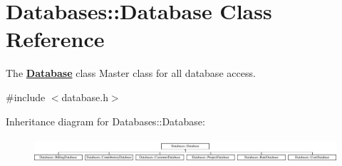\hypertarget{classDatabases_1_1Database}{}\section{Databases\+:\+:Database Class Reference}
\label{classDatabases_1_1Database}


The {\bfseries \hyperlink{classDatabases_1_1Database}{Database}} class Master class for all database access.  




{\ttfamily \#include $<$database.\+h$>$}

Inheritance diagram for Databases\+:\+:Database\+:\begin{figure}[H]
\begin{center}
\leavevmode
\includegraphics[height=0.897436cm]{dd/db0/classDatabases_1_1Database}
\end{center}
\end{figure}
